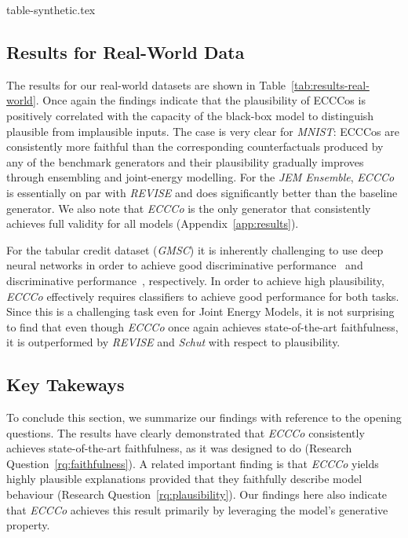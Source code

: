\documentclass{article}
\begin{document}
{table-synthetic.tex}

\subsection{Results for Real-World Data}

The results for our real-world datasets are shown in Table~\ref{tab:results-real-world}. Once again the findings indicate that the plausibility of ECCCos is positively correlated with the capacity of the black-box model to distinguish plausible from implausible inputs. The case is very clear for \textit{MNIST}: ECCCos are consistently more faithful than the corresponding counterfactuals produced by any of the benchmark generators and their plausibility gradually improves through ensembling and joint-energy modelling. For the \textit{JEM Ensemble}, \textit{ECCCo} is essentially on par with \textit{REVISE} and does significantly better than the baseline generator. We also note that \textit{ECCCo} is the only generator that consistently achieves full validity for all models (Appendix~\ref{app:results}). 

For the tabular credit dataset (\textit{GMSC}) it is inherently challenging to use deep neural networks in order to achieve good discriminative performance~\citep{borisov2021deep,grinsztajn2022why} and discriminative performance~\citep{liu2023goggle}, respectively. In order to achieve high plausibility, \textit{ECCCo} effectively requires classifiers to achieve good performance for both tasks. Since this is a challenging task even for Joint Energy Models, it is not surprising to find that even though \textit{ECCCo} once again achieves state-of-the-art faithfulness, it is outperformed by \textit{REVISE} and \textit{Schut} with respect to plausibility.

\subsection{Key Takeways}

To conclude this section, we summarize our findings with reference to the opening questions. The results have clearly demonstrated that \textit{ECCCo} consistently achieves state-of-the-art faithfulness, as it was designed to do (Research Question~\ref{rq:faithfulness}). A related important finding is that \textit{ECCCo} yields highly plausible explanations provided that they faithfully describe model behaviour (Research Question~\ref{rq:plausibility}). Our findings here also indicate that \textit{ECCCo} achieves this result primarily by leveraging the model's generative property.
\end{document}
